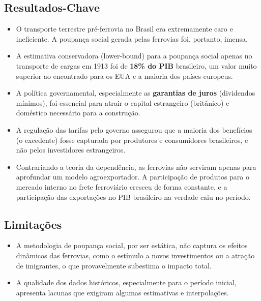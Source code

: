 \documentclass[12pt]{article}
\begin{document}
\subsection*{Resultados-Chave}
\begin{itemize}
    \item O transporte terrestre pré-ferrovia no Brasil era extremamente caro e ineficiente. A poupança social gerada pelas ferrovias foi, portanto, imensa.
    \item A estimativa conservadora (lower-bound) para a poupança social apenas no transporte de cargas em 1913 foi de \textbf{18\% do PIB} brasileiro, um valor muito superior ao encontrado para os EUA e a maioria dos países europeus.
    \item A política governamental, especialmente as \textbf{garantias de juros} (dividendos mínimos), foi essencial para atrair o capital estrangeiro (britânico) e doméstico necessário para a construção.
    \item A regulação das tarifas pelo governo assegurou que a maioria dos benefícios (o excedente) fosse capturada por produtores e consumidores brasileiros, e não pelos investidores estrangeiros.
    \item Contrariando a teoria da dependência, as ferrovias não serviram apenas para aprofundar um modelo agroexportador. A participação de produtos para o mercado interno no frete ferroviário cresceu de forma constante, e a participação das exportações no PIB brasileiro na verdade caiu no período.
\end{itemize}

\subsection*{Limitações}
\begin{itemize}
    \item A metodologia de poupança social, por ser estática, não captura os efeitos dinâmicos das ferrovias, como o estímulo a novos investimentos ou a atração de imigrantes, o que provavelmente subestima o impacto total.
    \item A qualidade dos dados históricos, especialmente para o período inicial, apresenta lacunas que exigiram algumas estimativas e interpolações.
\end{itemize}
\end{document}
